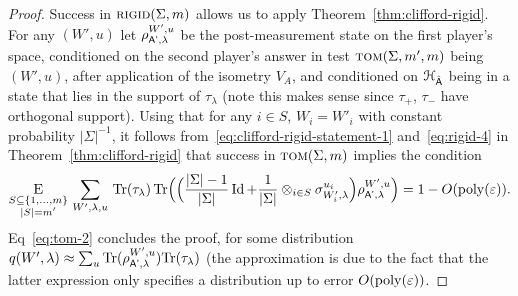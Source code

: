 \begin{proof}
Success in $\textsc{rigid}(\Sigma,m)$ allows us to apply Theorem~\ref{thm:clifford-rigid}. For any $(W',u)$ let $\rho_{{\textsf{A'}},\lambda}^{W',u}$ be the post-measurement state on the first player's space, conditioned on the second player's answer  in test $\textsc{tom}(\Sigma,m',m)$ being $(W',u)$, after application of the isometry $V_A$, and conditioned on $\mathcal{H}_{\hat{{\textsf{A}}}}$ being in a state that lies in the support of $\tau_\lambda$ (note this makes sense since $\tau_+$, $\tau_-$ have orthogonal support). 
Using that for any $i\in S$, $W_i=W'_i$ with constant probability $|\Sigma|^{-1}$, 
it follows from~\eqref{eq:clifford-rigid-statement-1} and~\eqref{eq:rigid-4} in Theorem~\ref{thm:clifford-rigid} that success in $\textsc{tom}(\Sigma,m)$ implies the condition
\begin{equation}\label{eq:tom-2}
\mathop{\textsc{E}}_{\substack{S\subseteq \{1,\ldots,m\}\\|S|=m'}}\, \sum_{W',\lambda,u}\,\mbox{\rm Tr}(\tau_\lambda)  \,\mbox{\rm Tr}\Big(\Big( \frac{|\Sigma|-1}{|\Sigma|}\mathop{\rm Id}\nolimits + \frac{1}{|\Sigma|}\otimes_{i\in S}\sigma_{W'_i,\lambda}^{u_i} \Big) \rho_{{\textsf{A'}},\lambda}^{W',u}\Big)  = 1- O(\operatorname{poly}(\varepsilon)). 
\end{equation}
Eq~\eqref{eq:tom-2} concludes the proof, for some distribution $q(W',\lambda) \approx \sum_u \mbox{\rm Tr}(\rho_{{\textsf{A'}},\lambda}^{W',u})\mbox{\rm Tr}(\tau_\lambda)$ (the approximation is due to the fact that the latter expression only specifies a distribution up to error $O(\operatorname{poly}(\varepsilon))$.
\end{proof}


